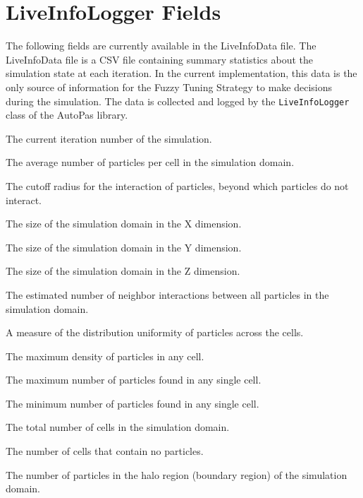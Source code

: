 \section{LiveInfoLogger Fields}
\label{des:liveinfodatafields}

The following fields are currently available in the LiveInfoData file. The LiveInfoData file is a CSV file containing summary statistics about the simulation state at each iteration. In the current implementation, this data is the only source of information for the Fuzzy Tuning Strategy to make decisions during the simulation. The data is collected and logged by the \texttt{LiveInfoLogger} class of the AutoPas library.

\begin{description}[style=multiline, leftmargin =40mm]
  \item [Iteration] The current iteration number of the simulation.
  \item [avgParticlesPerCell] The average number of particles per cell in the simulation domain.
  \item [cutoff] The cutoff radius for the interaction of particles, beyond which particles do not interact.
  \item [domainSizeX] The size of the simulation domain in the X dimension.
  \item [domainSizeY] The size of the simulation domain in the Y dimension.
  \item [domainSizeZ] The size of the simulation domain in the Z dimension.
  \item [estimatedNumNeighborInteractions] The estimated number of neighbor interactions between all particles in the simulation domain.
  \item [homogeneity] A measure of the distribution uniformity of particles across the cells.
  \item [maxDensity] The maximum density of particles in any cell.
  \item [maxParticlesPerCell] The maximum number of particles found in any single cell.
  \item [minParticlesPerCell] The minimum number of particles found in any single cell.
  \item [numCells] The total number of cells in the simulation domain.
  \item [numEmptyCells] The number of cells that contain no particles.
  \item [numHaloParticles] The number of particles in the halo region (boundary region) of the simulation domain.

\end{description}
